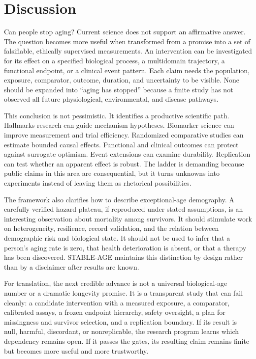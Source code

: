 \documentclass[10pt,conference]{IEEEtran}
\begin{document}
\section{Discussion}
\label{sec:discussion}

Can people stop aging? Current science does not support an affirmative answer. The question becomes more useful when transformed from a promise into a set of falsifiable, ethically supervised measurements. An intervention can be investigated for its effect on a specified biological process, a multidomain trajectory, a functional endpoint, or a clinical event pattern. Each claim needs the population, exposure, comparator, outcome, duration, and uncertainty to be visible. None should be expanded into ``aging has stopped'' because a finite study has not observed all future physiological, environmental, and disease pathways.

This conclusion is not pessimistic. It identifies a productive scientific path. Hallmarks research can guide mechanism hypotheses. Biomarker science can improve measurement and trial efficiency. Randomized comparative studies can estimate bounded causal effects. Functional and clinical outcomes can protect against surrogate optimism. Event extensions can examine durability. Replication can test whether an apparent effect is robust. The ladder is demanding because public claims in this area are consequential, but it turns unknowns into experiments instead of leaving them as rhetorical possibilities.

The framework also clarifies how to describe exceptional-age demography. A carefully verified hazard plateau, if reproduced under stated assumptions, is an interesting observation about mortality among survivors. It should stimulate work on heterogeneity, resilience, record validation, and the relation between demographic risk and biological state. It should not be used to infer that a person's aging rate is zero, that health deterioration is absent, or that a therapy has been discovered. STABLE-AGE maintains this distinction by design rather than by a disclaimer after results are known.

For translation, the next credible advance is not a universal biological-age number or a dramatic longevity promise. It is a transparent study that can fail cleanly: a candidate intervention with a measured exposure, a comparator, calibrated assays, a frozen endpoint hierarchy, safety oversight, a plan for missingness and survivor selection, and a replication boundary. If its result is null, harmful, discordant, or nonreplicable, the research program learns which dependency remains open. If it passes the gates, its resulting claim remains finite but becomes more useful and more trustworthy.
\end{document}
